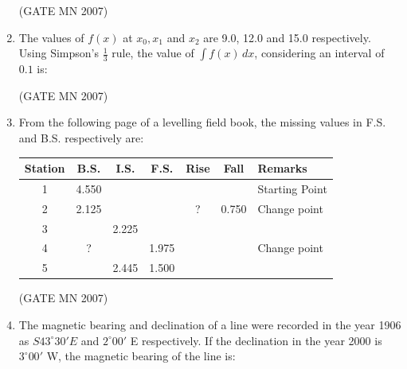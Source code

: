\documentclass[journal]{IEEEtran}
\begin{document}
\begin{enumerate}
\hfill (GATE MN 2007)

\item The values of $f(x)$ at $x_0, x_1$ and $x_2$ are 9.0, 12.0 and 15.0 respectively. Using Simpson's $\frac{1}{3}$ rule, the value of $\int f(x) \, dx$, considering an interval of $0.1$ is:
\begin{enumerate}
\end{enumerate}

\hfill (GATE MN 2007)

\item From the following page of a levelling field book, the missing values in F.S. and B.S. respectively are:

\begin{center}
\begin{tabular}{|c|c|c|c|c|c|l|}
\hline
Station & B.S. & I.S. & F.S. & Rise & Fall & Remarks \\
\hline
1 & 4.550 &     &     &      &      & Starting Point \\
\hline
2 & 2.125 &     &     &  ?    & 0.750 & Change point \\
\hline
3 &       & 2.225 &     &      &      &  \\
\hline
4 &    ?   &     & 1.975 &      &      & Change point \\
\hline
5 &       & 2.445 & 1.500 &      &      &  \\
\hline
\end{tabular}
\end{center}

\begin{enumerate}
\end{enumerate}

\hfill (GATE MN 2007)

\item The magnetic bearing and declination of a line were recorded in the year 1906 as $S43^\circ 30' E$ and $2^\circ 00'$ E respectively. If the declination in the year 2000 is $3^\circ 00'$ W, the magnetic bearing of the line is:
\begin{enumerate}
\end{enumerate}


\end{enumerate}
\end{document}

